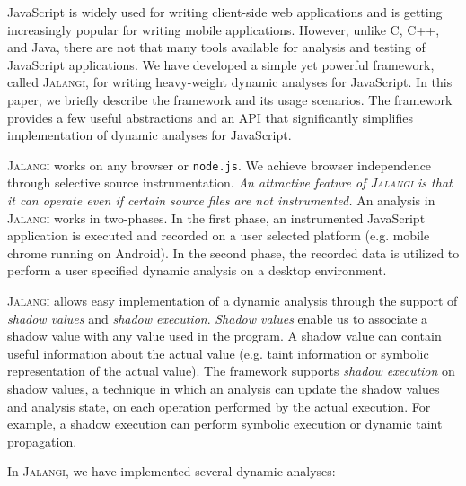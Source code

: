 \documentclass{sig-alternate}
\def\jalangi{\textsc{Jalangi}}
\begin{document}
JavaScript is widely used for writing client-side web applications and
is getting increasingly popular for writing mobile applications.
However, unlike C, C++, and Java, there are not that many tools
available for analysis and testing of JavaScript applications.  We
have developed a simple yet powerful framework, called \jalangi{}, for
writing heavy-weight dynamic analyses for JavaScript.  In this paper,
we briefly describe the framework and its usage scenarios.  The
framework provides a few useful abstractions and an API that
significantly simplifies implementation of dynamic analyses for
JavaScript.

\jalangi{} works on any browser or \texttt{node.js}.  We achieve
browser independence through selective source
instrumentation. \emph{An attractive feature of \jalangi{} is that it
  can operate even if certain source files are not instrumented.}  An
analysis in \jalangi{} works in two-phases.  In the first phase, an
instrumented JavaScript application is executed and recorded on a user
selected platform (e.g. mobile chrome running on Android).  In the
second phase, the recorded data is utilized to perform a user
specified dynamic analysis on a desktop environment.

\jalangi{} allows easy implementation of a dynamic analysis through
the support of \emph{shadow values} and \emph{shadow execution}.
\emph{Shadow values} enable us to associate a shadow value with any
value used in the program.  A shadow value can contain useful
information about the actual value (e.g. taint information or symbolic
representation of the actual value).  The framework supports
\emph{shadow execution} on shadow values, a technique in which an
analysis can update the shadow values and analysis state, on each
operation performed by the actual execution.  For example, a shadow
execution can perform symbolic execution or dynamic taint propagation.

In \jalangi{}, we have implemented several dynamic analyses:
\end{document}
